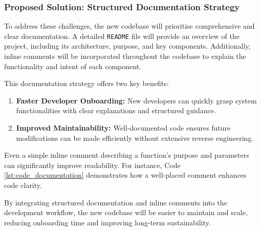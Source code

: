\subsubsection{Proposed Solution: Structured Documentation Strategy}
To address these challenges, the new codebase will prioritise comprehensive and clear documentation. A detailed \texttt{README} file will provide an overview of the project, including its architecture, purpose, and key components. Additionally, inline comments will be incorporated throughout the codebase to explain the functionality and intent of each component.

This documentation strategy offers two key benefits:
\begin{enumerate}
    \item \textbf{Faster Developer Onboarding:} New developers can quickly grasp system functionalities with clear explanations and structured guidance.
    \item \textbf{Improved Maintainability:} Well-documented code ensures future modifications can be made efficiently without extensive reverse engineering.
\end{enumerate}

Even a simple inline comment describing a function’s purpose and parameters can significantly improve readability. For instance, Code \ref{lst:code_documentation} demonstrates how a well-placed comment enhances code clarity.

By integrating structured documentation and inline comments into the development workflow, the new codebase will be easier to maintain and scale, reducing onboarding time and improving long-term sustainability.
